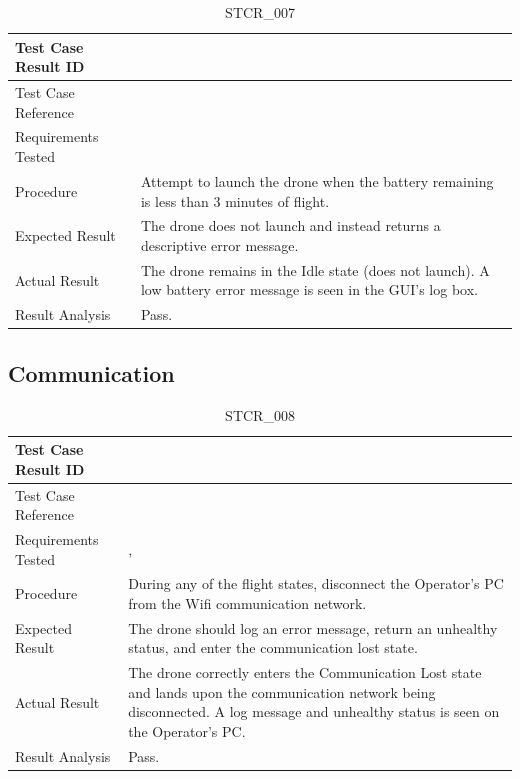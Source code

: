 \documentclass[12pt, titlepage]{article}
\begin{document}
\begin{table}[!h]
\begin{center}
\caption {STCR\_007}
\label{tab:STCR_007}
\begin{tabular}{ | m{3.2cm} | m{12.2cm} | } 
\hline
Test Case Result ID & \nameref{tab:STCR_007} \\ 
\hline
Test Case Reference & \nameref{tab:STC_007}  \\ 
\hline
Requirements Tested & \nameref{SR_012} \\ 
\hline
Procedure & Attempt to launch the drone when the battery remaining is less than 3 minutes of flight.  \\ 
\hline
Expected Result & The drone does not launch and instead returns a descriptive error message.   \\ 
\hline
Actual Result & The drone remains in the Idle state (does not launch). A low battery error message is seen in the GUI's log box.  \\
\hline
Result Analysis & Pass. \\ 
\hline
\end{tabular}
\end{center}
\end{table}

\clearpage

\subsection{Communication}

\begin{table}[!h]
\begin{center}
\caption {STCR\_008}
\label{tab:STCR_008}
\begin{tabular}{ | m{3.2cm} | m{12.2cm} | } 
\hline
Test Case Result ID & \nameref{tab:STCR_008} \\ 
\hline
Test Case Reference & \nameref{tab:STC_008}  \\ 
\hline
Requirements Tested & \nameref{STA_010}, \nameref{TRANS_010}
\\ 
\hline
Procedure & During any of the flight states, disconnect the Operator's PC from the Wifi communication network.     \\ 
\hline
Expected Result & The drone should log an error message, return an unhealthy status, and enter the communication lost state.   \\ 
\hline
Actual Result & The drone correctly enters the Communication Lost state and lands upon the communication network being disconnected. A log message and unhealthy status is seen on the Operator's PC.  \\ 
\hline
Result Analysis & Pass.    \\ 
\hline
\end{tabular}
\end{center}
\end{table}
\end{document}
